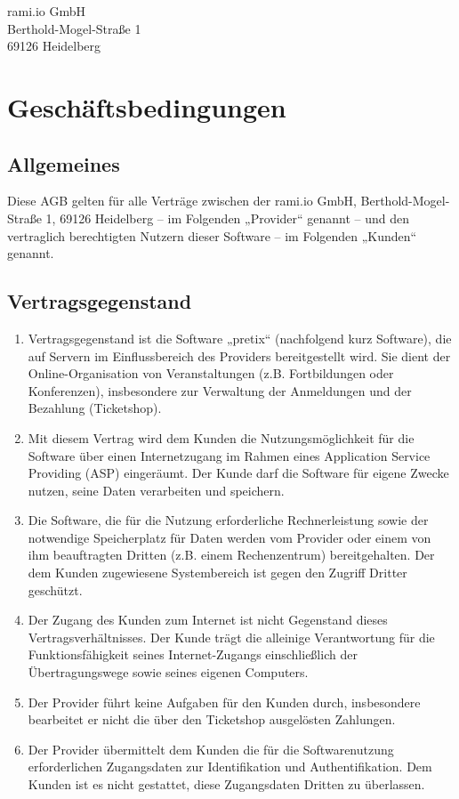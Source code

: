 \documentclass{terms}
\begin{document}
\maketitle

\begin{center}
rami.io GmbH\\
Berthold-Mogel-Straße 1\\
69126 Heidelberg
\end{center}
\sloppy

\section{Geschäftsbedingungen}
\subsection{Allgemeines}
Diese AGB gelten für alle Verträge zwischen der rami.io GmbH, Berthold-Mogel-Straße 1, 69126 Heidelberg
– im Folgenden „Provider“ genannt – und den vertraglich berechtigten Nutzern dieser Software – im Folgenden „Kunden“ genannt.

\subsection{Vertragsgegenstand}
\begin{enumerate}
\item Vertragsgegenstand ist die Software „pretix“ (nachfolgend kurz Software), die auf Servern im Einflussbereich des Providers bereitgestellt wird. Sie dient der Online-Organisation von Veranstaltungen (z.B. Fortbildungen oder Konferenzen), insbesondere zur Verwaltung der Anmeldungen und der Bezahlung (Ticketshop).
\item Mit diesem Vertrag wird dem Kunden die Nutzungsmöglichkeit für die Software über einen Internetzugang im Rahmen eines Application Service Providing (ASP) eingeräumt. Der Kunde darf die Software für eigene Zwecke nutzen, seine Daten verarbeiten und speichern.
\item Die Software, die für die Nutzung erforderliche Rechnerleistung sowie der notwendige Speicherplatz für Daten werden vom Provider oder einem von ihm beauftragten Dritten (z.B. einem Rechenzentrum) bereitgehalten. Der dem Kunden zugewiesene Systembereich ist gegen den Zugriff Dritter geschützt.
\item Der Zugang des Kunden zum Internet ist nicht Gegenstand dieses Vertragsverhältnisses. Der Kunde trägt die alleinige Verantwortung für die Funktionsfähigkeit seines Internet-Zugangs einschließlich der Übertragungswege sowie seines eigenen Computers.
\item Der Provider führt keine Aufgaben für den Kunden durch, insbesondere bearbeitet er nicht die über den Ticketshop ausgelösten Zahlungen.
\item Der Provider übermittelt dem Kunden die für die Softwarenutzung erforderlichen Zugangsdaten zur Identifikation und Authentifikation. Dem Kunden ist es nicht gestattet, diese Zugangsdaten Dritten zu überlassen.
\end{enumerate}
\end{document}

